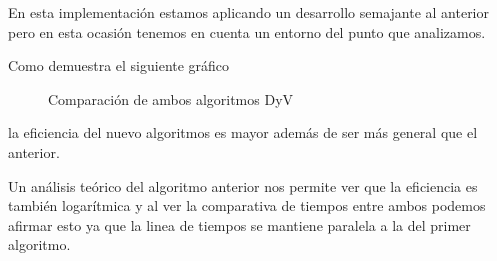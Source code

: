 \documentclass{article}
\begin{document}
En esta implementación estamos aplicando un desarrollo semajante al
anterior pero en esta ocasión tenemos en cuenta un entorno del punto
que analizamos.

Como demuestra el siguiente gráfico

\begin{figure}[H]
  \centering   

\caption{Comparación de ambos algoritmos DyV}
\end{figure}
la eficiencia del nuevo algoritmos es mayor además de ser más general
que el anterior.

Un análisis teórico del algoritmo anterior nos permite ver que la
eficiencia es también logarítmica y al ver la comparativa de tiempos
entre ambos podemos afirmar esto ya que la linea de tiempos se
mantiene paralela a la del primer algoritmo.
\end{document}
